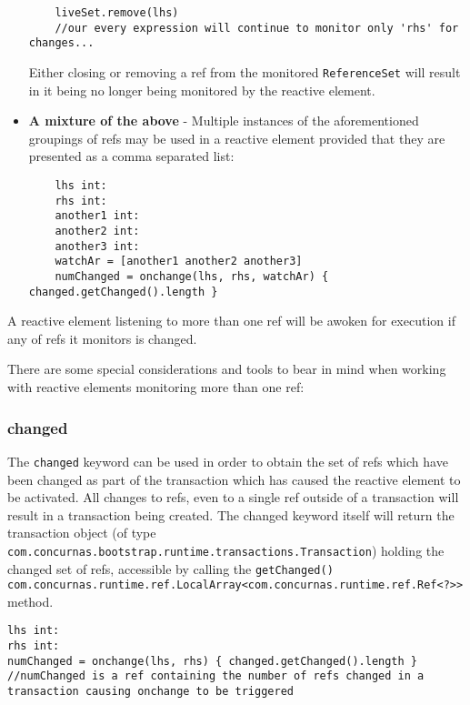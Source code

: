 \documentclass[conc-doc]{subfiles}
\begin{document}
\begin{itemize}
\begin{lstlisting}
	liveSet.remove(lhs)
	//our every expression will continue to monitor only 'rhs' for changes...
	\end{lstlisting}
	Either closing or removing a ref from the monitored \lstinline{ReferenceSet} will result in it being no longer being monitored by the reactive element.	
	\item \textbf{A mixture of the above} - Multiple instances of the aforementioned groupings of refs may be used in a reactive element provided that they are presented as a comma separated list:
	\begin{lstlisting}
	lhs int:
	rhs int:
	another1 int:
	another2 int:
	another3 int:
	watchAr = [another1 another2 another3]
	numChanged = onchange(lhs, rhs, watchAr) { changed.getChanged().length }
	\end{lstlisting}	
\end{itemize}

A reactive element listening to more than one ref will be awoken for execution if any of refs it monitors is changed. 

There are some special considerations and tools to bear in mind when working with reactive elements monitoring more than one ref:

\subsubsection{changed}
The \lstinline{changed} keyword can be used in order to obtain the set of refs which have been changed as part of the transaction which has caused the reactive element to be activated. All changes to refs, even to a single ref outside of a transaction will result in a transaction being created. The changed keyword itself will return the transaction object (of type \lstinline{com.concurnas.bootstrap.runtime.transactions.Transaction}) holding the changed set of refs, accessible by calling the \lstinline{getChanged() com.concurnas.runtime.ref.LocalArray<com.concurnas.runtime.ref.Ref<?>>} method.

\begin{lstlisting}
lhs int:
rhs int:
numChanged = onchange(lhs, rhs) { changed.getChanged().length }
//numChanged is a ref containing the number of refs changed in a transaction causing onchange to be triggered
\end{lstlisting}
\end{document}
